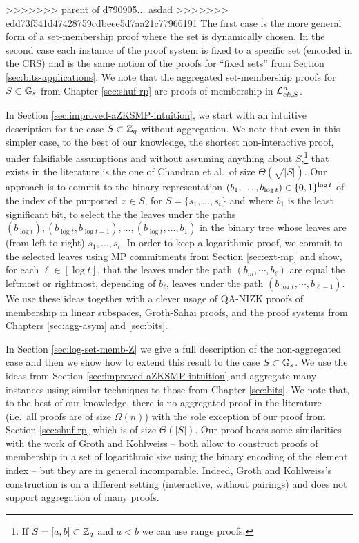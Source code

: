 >>>>>>> parent of d790905... asdad
>>>>>>> edd73f541d47428759cdbeee5d7aa21c77966191
The first case is the more general form of a set-membership proof where the set is dynamically chosen. In the second case each instance of the proof system is fixed to a specific set (encoded in the CRS) and is the same notion of the proofs for ``fixed sets'' from Section \ref{sec:bits-applications}. We note that the aggregated set-membership proofs for $S\subset\mathbb{G}_s$ from Chapter \ref{sec:shuf-rp} are proofs of membership in $\mathcal{L}_{ck,S}^n$.

In Section \ref{sec:improved-aZKSMP-intuition}, we start with an intuitive description for the case $S\subset\mathbb{Z}_q$ without aggregation. We note that even in this simpler case, to the best of our knowledge, the shortest non-interactive proof, under falsifiable assumptions and without assuming anything about $S$,\footnote{If $S=[a,b]\subset\mathbb{Z}_q$ and $a<b$ we can use range proofs.} that exists in the literature is the one of Chandran et al.~of size $\Theta(\sqrt{|S|})$.
Our approach is to commit to the binary representation $(b_1,\ldots,b_{\log t})\in\{0,1\}^{\log t}$ of the index of the purported $x\in S$, for $S=\{s_1,\ldots,s_t\}$ and where $b_1$ is the least significant bit, to select the the leaves under the paths $(b_{\log t}),(b_{\log t},b_{\log t-1}),\ldots,(b_{\log t},\ldots, b_1)$ in the binary tree whose leaves are (from left to right) $s_1,\ldots,s_t$. In order to keep a logarithmic proof, we commit to the selected leaves using MP commitments from Section \ref{sec:ext-mp} and show, for each $\ell\in[\log t]$, that the leaves under the path $(b_m,\cdots, b_{\ell})$ are equal the leftmost or rightmost, depending of $b_\ell$, leaves under the path $(b_{\log t},\cdots, b_{\ell-1})$. We use these ideas together with a clever usage of QA-NIZK proofs of membership in linear subspaces, Groth-Sahai proofs, and the proof systems from Chapters \ref{sec:agg-asym} and \ref{sec:bits}.

In Section \ref{sec:log-set-memb-Z} we give a full description of the non-aggregated case and then we show how to extend this result to the case $S\subset\mathbb{G}_s$. We use the ideas from Section \ref{sec:improved-aZKSMP-intuition} and aggregate many instances using similar techniques to those from Chapter \ref{sec:bits}. We note that, to the best of our knowledge, there is no aggregated proof in the literature (i.e.~all proofs are of size $\Omega(n)$) with the sole exception of our proof from Section \ref{sec:shuf-rp} which is of size $\Theta(|S|)$.  
Our proof bears some similarities with the work of Groth and Kohlweiss \cite{EC:GroKoh15} -- both allow to construct proofs of membership in a set of logarithmic size using the binary encoding of the element index -- but they are in general incomparable. Indeed, Groth and Kohlweiss's construction is on a different setting (interactive, without pairings) and does not support aggregation of many proofs.

